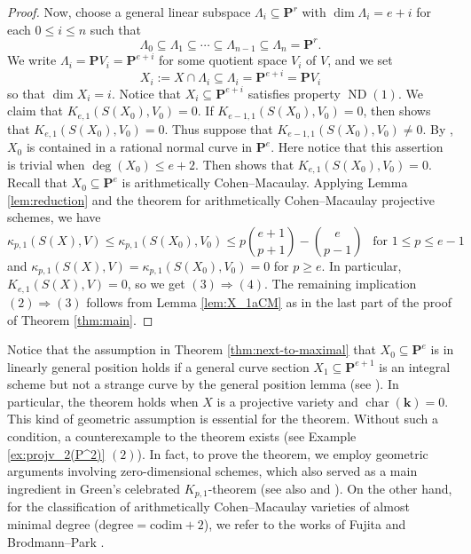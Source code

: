 \documentclass[12pt]{amsart}
\theoremstyle{definition}
\theoremstyle{remark}
\theoremstyle{corollary}
\theoremstyle{theorem}
\theoremstyle{corollary}
\theoremstyle{corollary}
\theoremstyle{definition}
\theoremstyle{remark}
\numberwithin{equation}{section}
\newcommand{\kk}{\mathbf{k}}
\def\nP{\mathbf{P}}
\DeclareMathOperator{\ND}{ND}
\begin{document}
\begin{proof}
Now, choose a general linear subspace $\Lambda_i \subseteq \nP^r$ with $\dim \Lambda_i=e+i$ for each $0 \leq i \leq n$ such that
$$
\Lambda_0 \subseteq \Lambda_1 \subseteq \cdots \subseteq \Lambda_{n-1} \subseteq \Lambda_n = \nP^r.
$$
We write $\Lambda_i = \nP V_i = \nP^{e+i}$ for some quotient space $V_i$ of $V$, and we set
$$
X_i:=X \cap \Lambda_i \subseteq \Lambda_i = \nP^{e+i} = \nP V_i
$$
so that $\dim X_i = i$. Notice that $X_i \subseteq \nP^{e+i}$ satisfies property $\ND(1)$. We claim that $K_{e,1}(S(X_0), V_0)=0$. If $K_{e-1,1}(S(X_0), V_0)=0$, then \cite[Proposition 2.11]{AN} shows that $K_{e,1}(S(X_0), V_0)=0$. Thus suppose that $K_{e-1,1}(S(X_0), V_0) \neq 0$. By \cite[Proposition 3.3]{NP}, $X_0$ is contained in a rational normal curve in $\nP^e$. Here notice that this assertion is trivial when $\deg(X_0) \leq e+2$. Then \cite[Lemma 2.1]{NP} shows that $K_{e,1}(S(X_0), V_0)=0$. Recall that $X_0 \subseteq \nP^e$ is arithmetically Cohen--Macaulay. Applying Lemma \ref{lem:reduction} and the theorem for arithmetically Cohen--Macaulay projective schemes, we have
$$
\kappa_{p,1}(S(X), V) \leq \kappa_{p,1}(S(X_0), V_0) \leq p {e+1 \choose p+1} - {e \choose p-1}~~\text{ for $1 \leq p \leq e-1$}
$$
and $\kappa_{p,1}(S(X), V)=\kappa_{p,1}(S(X_0), V_0)=0$ for $p \geq e$. In particular, $K_{e,1}(S(X),V) =0$, so we get $(3) 
\Longrightarrow (4)$. The remaining implication $(2) \Longrightarrow (3)$ follows from Lemma \ref{lem:X_1aCM} as in the last part of the proof of Theorem \ref{thm:main}.
\end{proof}

Notice that the assumption in Theorem \ref{thm:next-to-maximal} that $X_0 \subseteq \nP^e$ is in linearly general position holds if a general curve section $X_1 \subseteq \nP^{e+1}$ is an integral scheme but not a strange curve by the general position lemma (see \cite[Lemma 1.1]{Rathmann}). In particular, the theorem holds when $X$ is a projective variety and $\operatorname{char}(\kk)=0$. This kind of geometric assumption is essential for the theorem. Without such a condition, a counterexample to the theorem exists (see Example \ref{ex:projv_2(P^2)} $(2)$). In fact, to prove the theorem, we employ geometric arguments involving zero-dimensional schemes, which also served as a main ingredient in Green’s celebrated $K_{p,1}$-theorem \cite{Green1, Green2} (see also \cite[Section 3.3]{AN} and \cite[Section 3]{NP}). On the other hand, for the classification of arithmetically Cohen--Macaulay varieties of almost minimal degree ($\text{degree}=\text{codim}+2$),  we refer to the works of Fujita \cite{Fujita} and Brodmann--Park \cite{BP}.
\end{document}
